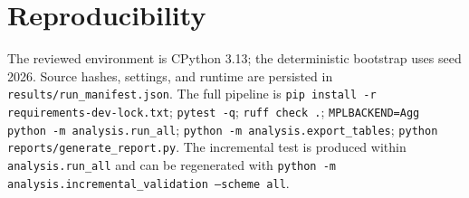 \documentclass[11pt]{article}
\begin{document}
\appendix
\section{Reproducibility}
The reviewed environment is CPython 3.13; the deterministic bootstrap uses seed
2026. Source hashes, settings, and runtime are persisted in
\texttt{results/run\_manifest.json}. The full pipeline is
\texttt{pip install -r requirements-dev-lock.txt}; \texttt{pytest -q};
\texttt{ruff check .}; \texttt{MPLBACKEND=Agg python -m analysis.run\_all};
\texttt{python -m analysis.export\_tables};
\texttt{python reports/generate\_report.py}. The incremental test is produced
within \texttt{analysis.run\_all} and can be regenerated with
\texttt{python -m analysis.incremental\_validation --scheme all}.
\end{document}
